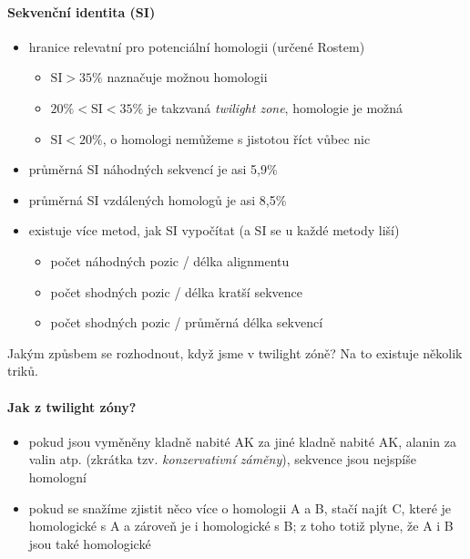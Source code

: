 \documentclass[DIV=8]{scrreprt}
\begin{document}
\paragraph{Sekvenční identita (SI)}
\begin{itemize}[nosep]
    \item hranice relevatní pro potenciální homologii (určené Rostem)
\begin{itemize}[nosep]
    \item \(\text{SI} > 35\%\) naznačuje možnou homologii
    \item \(20\% < \text{SI} < 35\%\) je takzvaná \emph{twilight zone}, homologie je možná
    \item \(\text{SI} < 20\%\), o homologi nemůžeme s jistotou říct vůbec nic
\end{itemize}

    \item průměrná SI náhodných sekvencí je asi 5,9\%
    \item průměrná SI vzdálených homologů je asi 8,5\%
    \item existuje více metod, jak SI vypočítat (a SI se u každé metody liší)
\begin{itemize}[nosep]
    \item počet náhodných pozic / délka alignmentu
    \item počet shodných pozic / délka kratší sekvence
    \item počet shodných pozic / průměrná délka sekvencí
\end{itemize}

\end{itemize}



Jakým způsbem se rozhodnout, když jsme v twilight zóně? Na to existuje několik triků.

\paragraph{Jak z twilight zóny?}
\begin{itemize}[nosep]
    \item pokud jsou vyměněny kladně nabité AK za jiné kladně nabité AK, alanin za valin atp. (zkrátka tzv. \emph{konzervativní záměny}), sekvence jsou nejspíše homologní
    \item pokud se snažíme zjistit něco více o homologii A a B, stačí najít C, které je homologické s A a zároveň je i homologické s B; z toho totiž plyne, že A i B jsou také homologické
\end{itemize}
\end{document}
